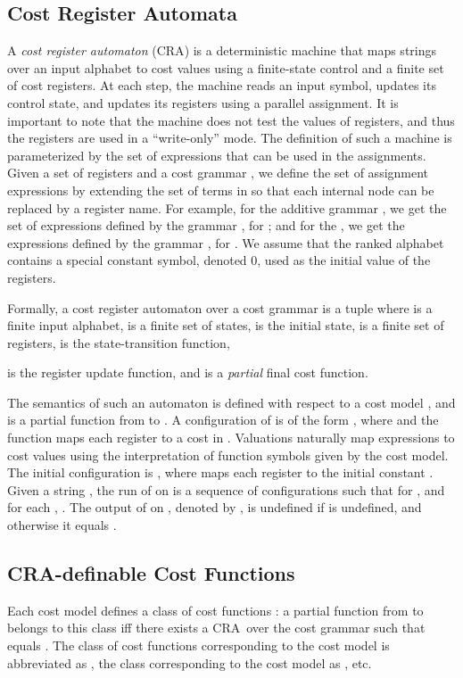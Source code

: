 \documentclass[11pt]{article}
\newcommand{\mypar}[1]{\subsection{#1}}
\newcommand{\EDWA}{{CRA}\xspace}
\begin{document}
\mypar{Cost Register Automata}
A {\em cost register automaton} (\EDWA) is a deterministic machine
that maps strings over an input alphabet to cost values using a
finite-state control and a finite set of cost registers.  At each
step, the machine reads an input symbol, updates its control state,
and updates its registers using a parallel assignment.  It is
important to note that the machine does not test the values of
registers, and thus the registers are used in a ``write-only'' mode.
The definition of such a machine is parameterized by the set of
expressions that can be used in the assignments.  Given a set  of
registers and a cost grammar , we define the set of assignment
expressions  by extending the set of terms in 
so that each internal node can be replaced by a register name.  For
example, for the additive grammar , we get the set
 of expressions defined by the grammar , for ; and for the , we get
the expressions  defined by the grammar , for .  We assume that the
ranked alphabet contains a special constant symbol, denoted 0, used as
the initial value of the registers.

Formally, a cost register automaton  over a cost grammar  is a tuple
 where
 is a finite input alphabet,
 is a finite set of states,
 is the initial state,
 is a finite set of registers,
 is the state-transition function,

is the register update function, and
 is a {\em partial\/}
final cost function.

The semantics of such an automaton is defined with respect to a cost
model , and is a partial
function  from  to
.  A configuration of  is of the form
, where  and
the function  maps each
register to a cost in .  Valuations naturally map expressions
to cost values using the interpretation of function symbols given by
the cost model.  The initial configuration is
, where  maps each register
to the initial constant .  Given a string , the run of  on  is a sequence of
configurations  such that for ,
 and for each , .  The
output of  on , denoted by
, is undefined if
 is undefined, and otherwise it equals
.

\mypar{CRA-definable Cost Functions}
Each cost model  defines a
class of cost functions : a partial function  from
 to  belongs to this class iff there exists a
\EDWA\  over the cost grammar  such that  equals
.  The class of cost functions
corresponding to the cost model  is abbreviated as
, the class corresponding to the cost model
 as , etc.

\newcommand{\sqp}{\ensuremath{\!\!+\!\!}}
\newcommand{\muc}{\multicolumn{1}{c}}
\end{document}

